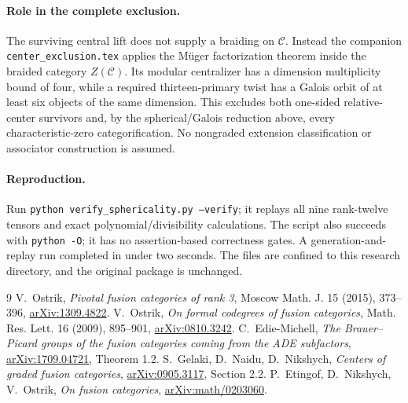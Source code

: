 \documentclass[11pt]{article}
\begin{document}
\paragraph{Role in the complete exclusion.}
The surviving central lift does not supply a braiding on $\mathcal C$.
Instead the companion \texttt{center\_exclusion.tex} applies the
M\"uger factorization theorem inside the braided category $Z(\mathcal C)$.
Its modular centralizer has a dimension multiplicity bound of four, while
a required thirteen-primary twist has a Galois orbit of at least six
objects of the same dimension. This excludes both one-sided relative-center
survivors and, by the spherical/Galois reduction above, every
characteristic-zero categorification. No nongraded extension classification
or associator construction is assumed.

\paragraph{Reproduction.}
Run \texttt{python verify\_sphericality.py --verify}; it replays all nine
rank-twelve tensors and exact polynomial/divisibility calculations.
The script also succeeds with \texttt{python -O}; it has no assertion-based
correctness gates. A generation-and-replay run completed in under two
seconds. The files are confined to this research directory, and the original
package is unchanged.

\begin{thebibliography}{9}
 V.~Ostrik,
\emph{Pivotal fusion categories of rank 3},
Moscow Math. J. 15 (2015), 373--396,
\href{https://arxiv.org/abs/1309.4822}{arXiv:1309.4822}.
 V.~Ostrik,
\emph{On formal codegrees of fusion categories},
Math. Res. Lett. 16 (2009), 895--901,
\href{https://arxiv.org/abs/0810.3242}{arXiv:0810.3242}.
 C.~Edie-Michell,
\emph{The Brauer--Picard groups of the fusion categories coming from the
ADE subfactors}, \href{https://arxiv.org/abs/1709.04721}{arXiv:1709.04721},
Theorem 1.2.
 S.~Gelaki, D.~Naidu, D.~Nikshych,
\emph{Centers of graded fusion categories},
\href{https://arxiv.org/abs/0905.3117}{arXiv:0905.3117}, Section 2.2.
 P.~Etingof, D.~Nikshych, V.~Ostrik,
\emph{On fusion categories},
\href{https://arxiv.org/abs/math/0203060}{arXiv:math/0203060}.
\end{thebibliography}
\end{document}
